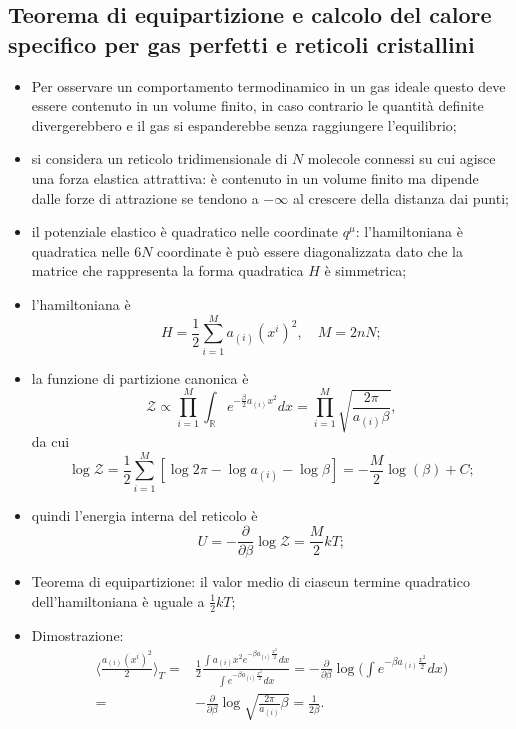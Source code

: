 \documentclass{article}
\theoremstyle{remark}
\begin{document}
\subsection{Teorema di equipartizione e calcolo del calore specifico per gas perfetti e reticoli cristallini}
\begin{itemize}
    \item Per osservare un comportamento termodinamico in un gas ideale questo deve essere contenuto in un volume finito, in caso contrario le quantità definite divergerebbero e il gas si espanderebbe senza raggiungere l'equilibrio;
    \item si considera un reticolo tridimensionale di $N$ molecole connessi su cui agisce una forza elastica attrattiva: è contenuto in un volume finito ma dipende dalle forze di attrazione se tendono a $-\infty$ al crescere della distanza dai punti;
    \item il potenziale elastico è quadratico nelle coordinate $q^\mu$: l'hamiltoniana è quadratica nelle $6N$ coordinate è può essere diagonalizzata dato che la matrice che rappresenta la forma quadratica $H$ è simmetrica;
    \item l'hamiltoniana è 
    \begin{equation}
        H=\frac{1}{2}\sum_{i=1}^Ma_{(i)}(x^i)^2,\quad M=2nN;
    \end{equation}
    \item la funzione di partizione canonica è
    \begin{equation}
        \mathcal{Z}\propto\prod_{i=1}^M\int_{\mathbb{R}}e^{-\frac{\beta}{2}a_{(i)}x^2}dx=\prod_{i=1}^M\sqrt{\frac{2\pi}{a_{(i)}\beta}},
    \end{equation}
    da cui
    \begin{equation}
        \log{\mathcal{Z}}=\frac{1}{2}\sum_{i=1}^M[\log{2\pi}-\log{a_{(i)}}-\log{\beta}]=-\frac{M}{2}\log{(\beta)}+C;
    \end{equation}
    \item quindi l'energia interna del reticolo è
    \begin{equation}
        U=-\frac{\partial}{\partial\beta}\log{\mathcal{Z}}=\frac{M}{2}kT;
    \end{equation}
    \item Teorema di equipartizione: il valor medio di ciascun termine quadratico dell'hamiltoniana è uguale a $\frac{1}{2}kT$;
    \item Dimostrazione:
    \begin{align}
        \langle\frac{a_{(i)}(x^i)^2}{2}\rangle_T=&\frac{1}{2}\frac{\int a_{(i)}x^2e^{-\beta a_{(i)}\frac{x^2}{2}}dx}{\int e^{-\beta a_{(i)}\frac{x^2}{2}}dx}=-\frac{\partial}{\partial\beta}\log{\bigg(\int e^{-\beta a_{(i)}\frac{x^2}{2}}dx\bigg)} \\
        =&-\frac{\partial}{\partial\beta}\log{\sqrt{\frac{2\pi}{a_{(i)}}\beta}}=\frac{1}{2\beta}.
    \end{align}
\end{itemize}
\end{document}
